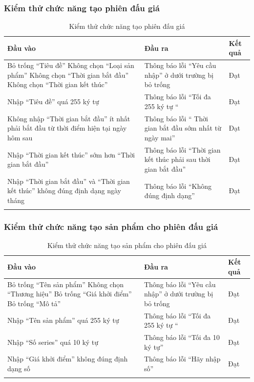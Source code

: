 \documentclass{article}
\begin{document}
\subsubsection{Kiểm thử chức năng tạo phiên đấu giá}
\newpage
    \begin{longtable}{| p{}|p{}|p{}|} 
    \hline
        \bfseries Đầu vào & \bfseries Đầu ra & \bfseries Kết quả\\\hline
        Bỏ trống “Tiêu đề”
        Không chọn “Loại sản phẩm”
        Không chọn “Thời gian bắt đầu”
        Không chọn  “Thời gian kết thúc”
        & Thông báo lỗi “Yêu cầu nhập” ở dưới trường bị bỏ trống&Đạt \\\hline
        Nhập “Tiêu đề” quá 255 ký tự
        & Thông báo lỗi “Tối đa 255 ký tự “&Đạt \\\hline
        Không nhập “Thời gian bắt đầu”  ít nhất phải bắt đầu từ thời điểm hiện tại ngày hôm sau
        & Thông báo lỗi “ Thời gian bắt đầu sớm nhất từ ngày mai”&Đạt \\\hline
        Nhập “Thời gian kết thúc” sớm hơn “Thời gian bắt đầu”
        & Thông báo lỗi “Thời gian kết thúc phải sau thời gian bắt đầu”&Đạt \\\hline
        Nhập “Thời gian bắt đầu” và “Thời gian kết thúc” không đúng định dạng ngày tháng
        & Thông báo lỗi “Không đúng định dạng”&Đạt \\\hline
    \caption{Kiểm thử chức năng tạo phiên đấu giá}
    \label{bang413}
    \end{longtable}
\subsubsection{Kiểm thử chức năng tạo sản phẩm cho phiên đấu giá}
    \begin{longtable}{| p{}|p{}|p{}|} 
    \hline
        \bfseries Đầu vào & \bfseries Đầu ra & \bfseries Kết quả\\\hline
        Bỏ trống “Tên sản phẩm”
        Không chọn “Thương hiệu”
        Bỏ trống “Giá khởi điểm”
        Bỏ trống “Mô tả”
        & Thông báo lỗi “Yêu cầu nhập” ở dưới trường bị bỏ trống&Đạt \\\hline
        Nhập “Tên sản phẩm” quá 255 ký tự
        & Thông báo lỗi “Tối đa 255 ký tự “&Đạt \\\hline
        Nhập “Số series” quá 10 ký tự
        & Thông báo lỗi “Tối đa 10 ký tự”&Đạt \\\hline
        Nhập “Giá khởi điểm” không đúng định dạng số
        & Thông báo lỗi “Hãy nhập số”&Đạt \\\hline
    \caption{Kiểm thử chức năng tạo sản phẩm cho phiên đấu giá}
    \label{bang414}
    \end{longtable}
\end{document}
